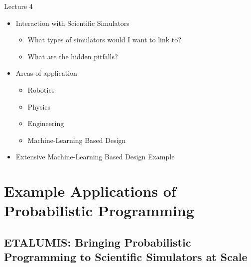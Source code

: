 \documentclass[AERbeamer%
              ,optEnglish%
              ,optBiber%
              ,optBibstyleAlphabetic%
              ,optBeamerClassicFormat%
              ]{AERlatex}%
\begin{document}
\begin{frame}[c]{Lecture 4}
    \centering
    \begin{itemize}
        \item Interaction with Scientific Simulators
        \begin{itemize}
            \item What types of simulators would I want to link to?
            \item What are the hidden pitfalls?
        \end{itemize}
        \item Areas of application
        \begin{itemize}
            \item Robotics
            \item Physics
            \item Engineering
            \item Machine-Learning Based Design
        \end{itemize}
        \item Extensive Machine-Learning Based Design Example
    \end{itemize}
\end{frame}



\section{Example Applications of Probabilistic Programming}


\subsection{ETALUMIS: Bringing Probabilistic Programming to Scientific Simulators at Scale}
\end{document}

